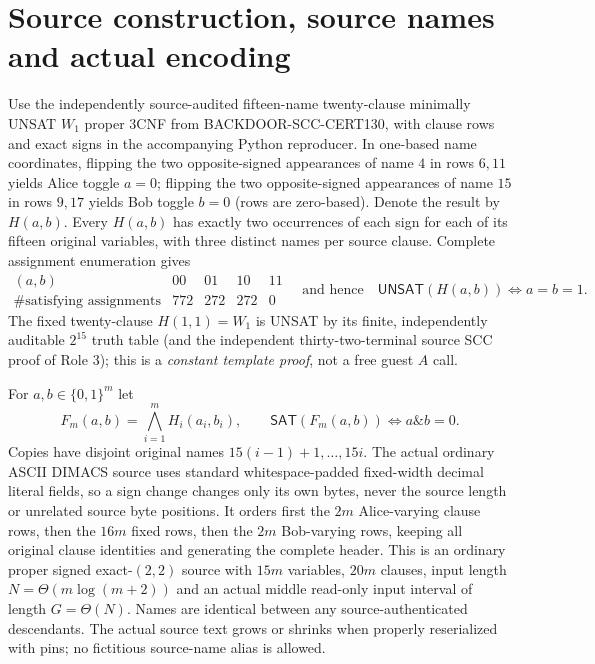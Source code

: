\documentclass[11pt]{article}
\newcommand{\SAT}{\mathsf{SAT}}
\newcommand{\UNSAT}{\mathsf{UNSAT}}
\begin{document}
\section{Source construction, source names and actual encoding}
Use the independently source-audited fifteen-name twenty-clause minimally UNSAT $W_1$ proper $3$CNF from BACKDOOR-SCC-CERT130, with clause rows and exact signs in the accompanying Python reproducer. In one-based name coordinates, flipping the two opposite-signed appearances of name $4$ in rows $6,11$ yields Alice toggle $a=0$; flipping the two opposite-signed appearances of name $15$ in rows $9,17$ yields Bob toggle $b=0$ (rows are zero-based). Denote the result by $H(a,b)$. Every $H(a,b)$ has exactly two occurrences of each sign for each of its fifteen original variables, with three distinct names per source clause. Complete assignment enumeration gives
\[
\begin{array}{c|rrrr}
(a,b)&00&01&10&11\\\hline
\#\text{satisfying assignments}&772&272&272&0
\end{array}\quad\text{and hence}\quad
\UNSAT(H(a,b))\iff a=b=1.\tag{1}
\]
The fixed twenty-clause $H(1,1)=W_1$ is UNSAT by its finite, independently auditable $2^{15}$ truth table (and the independent thirty-two-terminal source SCC proof of Role 3); this is a \emph{constant template proof}, not a free guest $A$ call.

For $a,b\in\{0,1\}^m$ let
\[
F_m(a,b)=\bigwedge_{i=1}^m H_i(a_i,b_i),\qquad
\SAT(F_m(a,b))\iff a\mathbin{\&}b=0.\tag{2}
\]
Copies have disjoint original names $15(i-1)+1,\ldots,15i$. The actual ordinary ASCII DIMACS source uses standard whitespace-padded fixed-width decimal literal fields, so a sign change changes only its own bytes, never the source length or unrelated source byte positions. It orders first the $2m$ Alice-varying clause rows, then the $16m$ fixed rows, then the $2m$ Bob-varying rows, keeping all original clause identities and generating the complete header. This is an ordinary proper signed exact-$(2,2)$ source with $15m$ variables, $20m$ clauses, input length $N=\Theta(m\log(m+2))$ and an actual middle read-only input interval of length $G=\Theta(N)$. Names are identical between any source-authenticated descendants. The actual source text grows or shrinks when properly reserialized with pins; no fictitious source-name alias is allowed.
\end{document}
